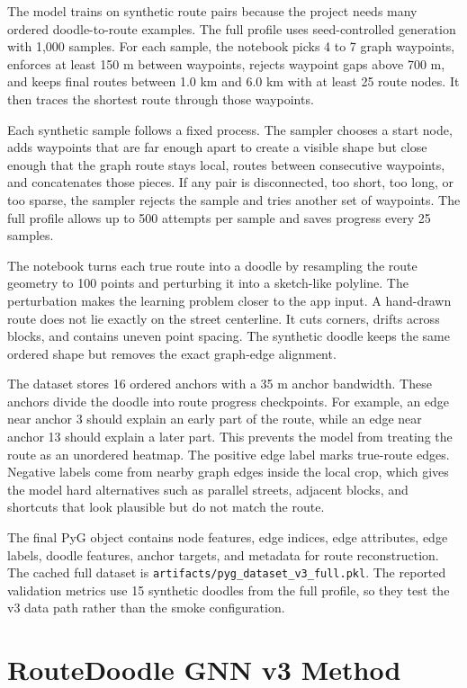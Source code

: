 \documentclass{article}
\begin{document}
The model trains on synthetic route pairs because the project needs many ordered doodle-to-route examples. The full profile uses seed-controlled generation with 1,000 samples. For each sample, the notebook picks 4 to 7 graph waypoints, enforces at least 150 m between waypoints, rejects waypoint gaps above 700 m, and keeps final routes between 1.0 km and 6.0 km with at least 25 route nodes. It then traces the shortest route through those waypoints.

Each synthetic sample follows a fixed process. The sampler chooses a start node, adds waypoints that are far enough apart to create a visible shape but close enough that the graph route stays local, routes between consecutive waypoints, and concatenates those pieces. If any pair is disconnected, too short, too long, or too sparse, the sampler rejects the sample and tries another set of waypoints. The full profile allows up to 500 attempts per sample and saves progress every 25 samples.

The notebook turns each true route into a doodle by resampling the route geometry to 100 points and perturbing it into a sketch-like polyline. The perturbation makes the learning problem closer to the app input. A hand-drawn route does not lie exactly on the street centerline. It cuts corners, drifts across blocks, and contains uneven point spacing. The synthetic doodle keeps the same ordered shape but removes the exact graph-edge alignment.

The dataset stores 16 ordered anchors with a 35 m anchor bandwidth. These anchors divide the doodle into route progress checkpoints. For example, an edge near anchor 3 should explain an early part of the route, while an edge near anchor 13 should explain a later part. This prevents the model from treating the route as an unordered heatmap. The positive edge label marks true-route edges. Negative labels come from nearby graph edges inside the local crop, which gives the model hard alternatives such as parallel streets, adjacent blocks, and shortcuts that look plausible but do not match the route.

The final PyG object contains node features, edge indices, edge attributes, edge labels, doodle features, anchor targets, and metadata for route reconstruction. The cached full dataset is \texttt{artifacts/pyg\_dataset\_v3\_full.pkl}. The reported validation metrics use 15 synthetic doodles from the full profile, so they test the v3 data path rather than the smoke configuration.

\section{RouteDoodle GNN v3 Method}
\end{document}
